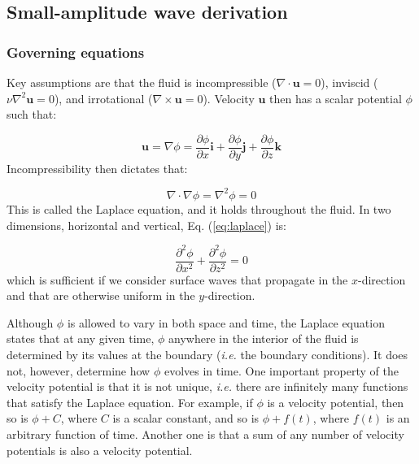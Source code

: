 \documentclass[12pt]{article}
\numberwithin{equation}{section}
\numberwithin{figure}{section}
\numberwithin{table}{section}
\begin{document}
\subsection{Small-amplitude wave derivation}

\subsubsection{Governing equations}
\label{sec:governing_equations}
Key assumptions are that the fluid is incompressible
($\nabla \cdot \mathbf{u} = 0$), inviscid ($\nu \nabla^2 \mathbf{u} = 0$),
and irrotational ($\nabla \times \mathbf{u} = 0$).
Velocity $\mathbf{u}$ then has a scalar potential $\phi$ such that:

\begin{equation}
  \mathbf{u} = \nabla \phi =
  \frac{\partial \phi}{\partial x} \mathbf{i} +
  \frac{\partial \phi}{\partial y} \mathbf{j} +
  \frac{\partial \phi}{\partial z} \mathbf{k}
\end{equation}
Incompressibility then dictates that:

\begin{equation}
  \nabla \cdot \nabla \phi = \nabla^2 \phi = 0
  \label{eq:laplace}
\end{equation}
This is called the Laplace equation, and it holds throughout the fluid.
In two dimensions, horizontal and vertical, Eq. (\ref{eq:laplace}) is:

\begin{equation}
  \frac{\partial^2 \phi}{\partial x^2} + \frac{\partial^2 \phi}{\partial z^2} = 0
  \label{eq:laplace_2d}
\end{equation}
which is sufficient if we consider surface waves that propagate in the
$x$-direction and that are otherwise uniform in the $y$-direction.

Although $\phi$ is allowed to vary in both space and time, the Laplace equation
states that at any given time, $\phi$ anywhere in the interior of the fluid is
determined by its values at the boundary (\textit{i.e.} the boundary conditions).
It does not, however, determine how $\phi$ evolves in time.
One important property of the velocity potential is that it is not unique,
\textit{i.e.} there are infinitely many functions that satisfy the Laplace
equation.
For example, if $\phi$ is a velocity potential, then so is $\phi + C$, where $C$
is a scalar constant, and so is $\phi + f(t)$, where $f(t)$ is an arbitrary
function of time.
Another one is that a sum of any number of velocity potentials is also a
velocity potential.
\end{document}
